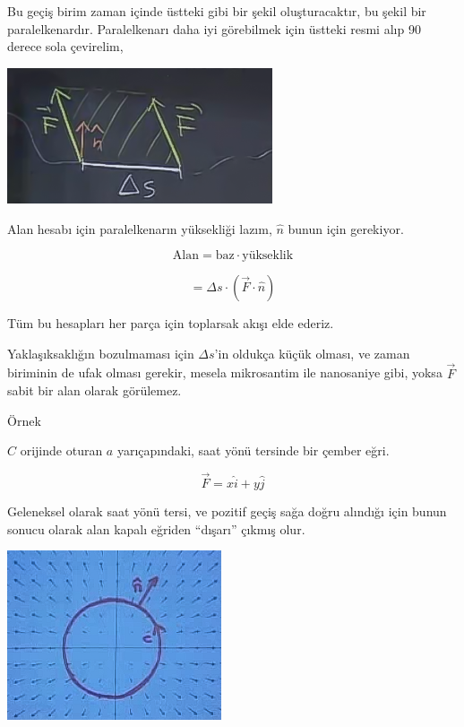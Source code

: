 \documentclass[12pt,fleqn]{article}\usepackage{../../common}
\begin{document}
Bu geçiş birim zaman içinde üstteki gibi bir şekil oluşturacaktır, bu
şekil bir paralelkenardır. Paralelkenarı daha iyi görebilmek için üstteki
resmi alıp 90 derece sola çevirelim, 

\begin{center}
\includegraphics[height=4cm]{23_5.png}
\end{center}

Alan hesabı için paralelkenarın yüksekliği lazım, $\hat{n}$ bunun için
gerekiyor. 

$$ \textrm{Alan}  = \textrm{baz} \cdot \textrm{yükseklik} $$

$$ = \Delta s \cdot (\vec{F} \cdot \hat{n} )$$

Tüm bu hesapları her parça için toplarsak akışı elde ederiz. 

Yaklaşıksaklığın bozulmaması için $\Delta s$'in oldukça küçük olması, ve
zaman biriminin de ufak olması gerekir, mesela mikrosantim ile nanosaniye
gibi, yoksa $\vec{F}$ sabit bir alan olarak görülemez. 

Örnek

$C$ orijinde oturan $a$ yarıçapındaki, saat yönü tersinde bir çember eğri. 

$$ \vec{F} = x\hat{i} + y\hat{j} $$

Geleneksel olarak saat yönü tersi, ve pozitif geçiş sağa doğru alındığı
için bunun sonucu olarak alan kapalı eğriden ``dışarı'' çıkmış olur. 

\begin{center}
\includegraphics[height=5cm]{23_6.png}
\end{center}
\end{document}
